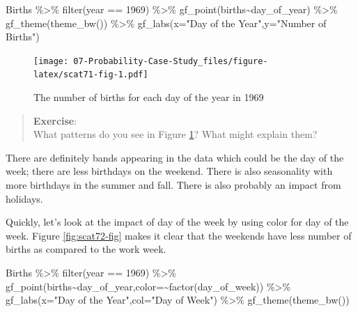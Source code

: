 \documentclass[
]{book}
\newenvironment{Shaded}{\begin{snugshade}}{\end{snugshade}}
\newcommand{\AttributeTok}[1]{\textcolor[rgb]{0.77,0.63,0.00}{#1}}
\newcommand{\DecValTok}[1]{\textcolor[rgb]{0.00,0.00,0.81}{#1}}
\newcommand{\FunctionTok}[1]{\textcolor[rgb]{0.00,0.00,0.00}{#1}}
\newcommand{\NormalTok}[1]{#1}
\newcommand{\SpecialCharTok}[1]{\textcolor[rgb]{0.00,0.00,0.00}{#1}}
\newcommand{\StringTok}[1]{\textcolor[rgb]{0.31,0.60,0.02}{#1}}
\begin{document}
\begin{Shaded}
\begin{Highlighting}[]
\NormalTok{Births }\SpecialCharTok{\%\textgreater{}\%}
  \FunctionTok{filter}\NormalTok{(year }\SpecialCharTok{==} \DecValTok{1969}\NormalTok{) }\SpecialCharTok{\%\textgreater{}\%}
  \FunctionTok{gf\_point}\NormalTok{(births}\SpecialCharTok{\textasciitilde{}}\NormalTok{day\_of\_year) }\SpecialCharTok{\%\textgreater{}\%}
  \FunctionTok{gf\_theme}\NormalTok{(}\FunctionTok{theme\_bw}\NormalTok{()) }\SpecialCharTok{\%\textgreater{}\%}
  \FunctionTok{gf\_labs}\NormalTok{(}\AttributeTok{x=}\StringTok{"Day of the Year"}\NormalTok{,}\AttributeTok{y=}\StringTok{"Number of Births"}\NormalTok{)}
\end{Highlighting}
\end{Shaded}

\begin{figure}
\centering
\texttt{[image: 07-Probability-Case-Study\_files/figure-latex/scat71-fig-1.pdf]}
\caption{\label{fig:scat71-fig}The number of births for each day of the year in 1969}
\end{figure}

\begin{quote}
\textbf{Exercise}:\\
What patterns do you see in Figure \ref{fig:scat71-fig}? What might explain them?
\end{quote}

There are definitely bands appearing in the data which could be the day of the week; there are less birthdays on the weekend. There is also seasonality with more birthdays in the summer and fall. There is also probably an impact from holidays.

Quickly, let's look at the impact of day of the week by using color for day of the week. Figure \ref{fig:scat72-fig} makes it clear that the weekends have less number of births as compared to the work week.

\begin{Shaded}
\begin{Highlighting}[]
\NormalTok{Births }\SpecialCharTok{\%\textgreater{}\%}
  \FunctionTok{filter}\NormalTok{(year }\SpecialCharTok{==} \DecValTok{1969}\NormalTok{) }\SpecialCharTok{\%\textgreater{}\%}
  \FunctionTok{gf\_point}\NormalTok{(births}\SpecialCharTok{\textasciitilde{}}\NormalTok{day\_of\_year,}\AttributeTok{color=}\SpecialCharTok{\textasciitilde{}}\FunctionTok{factor}\NormalTok{(day\_of\_week)) }\SpecialCharTok{\%\textgreater{}\%}
  \FunctionTok{gf\_labs}\NormalTok{(}\AttributeTok{x=}\StringTok{"Day of the Year"}\NormalTok{,}\AttributeTok{col=}\StringTok{"Day of Week"}\NormalTok{) }\SpecialCharTok{\%\textgreater{}\%}
  \FunctionTok{gf\_theme}\NormalTok{(}\FunctionTok{theme\_bw}\NormalTok{())}
\end{Highlighting}
\end{Shaded}
\end{document}
